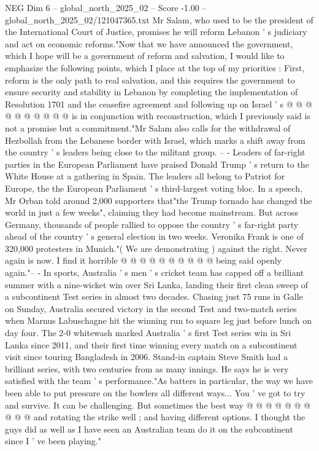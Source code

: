 \begin{textsample}{NEG Dim 6 – global\_north\_2025\_02 – Score -1.00 – global\_north\_2025\_02/121047365.txt}
Mr Salam, who used to be the president of the International Court of Justice, promises he will reform Lebanon ' s judiciary and act on economic reforms."Now that we have announced the government, which I hope will be a government of reform and salvation, I would like to emphasize the following points, which I place at the top of my priorities : First, reform is the only path to real salvation, and this requires the government to ensure security and stability in Lebanon by completing the implementation of Resolution 1701 and the ceasefire agreement and following up on Israel ' s @ @ @ @ @ @ @ @ @ @ is in conjunction with reconstruction, which I previously said is not a promise but a commitment."Mr Salam also calls for the withdrawal of Hezbollah from the Lebanese border with Israel, which marks a shift away from the country ' s leaders being close to the militant group. -- - Leaders of far-right parties in the European Parliament have praised Donald Trump ' s return to the White House at a gathering in Spain.
The leaders all belong to Patriot for Europe, the the European Parliament ' s third-largest voting bloc.
In a speech, Mr Orban told around 2,000 supporters that"the Trump tornado has changed the world in just a few weeks", claiming they had become mainstream.
But across Germany, thousands of people rallied to oppose the country ' s far-right party ahead of the country ' s general election in two weeks.
Veronika Frank is one of 320,000 protesters in Munich."( We are demonstrating ) against the right.
Never again is now.
I find it horrible @ @ @ @ @ @ @ @ @ @ being said openly again."-- - In sports, Australia ' s men ' s cricket team has capped off a brilliant summer with a nine-wicket win over Sri Lanka, landing their first clean sweep of a subcontinent Test series in almost two decades.
Chasing just 75 runs in Galle on Sunday, Australia secured victory in the second Test and two-match series when Marnus Labuschagne hit the winning run to square leg just before lunch on day four.
The 2-0 whitewash marked Australia ' s first Test series win in Sri Lanka since 2011, and their first time winning every match on a subcontinent visit since touring Bangladesh in 2006.
Stand-in captain Steve Smith had a brilliant series, with two centuries from as many innings.
He says he is very satisfied with the team ' s performance."As batters in particular, the way we have been able to put pressure on the bowlers all different ways...
You ' ve got to try and survive.
It can be challenging.
But sometimes the best way @ @ @ @ @ @ @ @ @ @ and rotating the strike well ; and having different options.
I thought the guys did as well as I have seen an Australian team do it on the subcontinent since I ' ve been playing."

\end{textsample}
